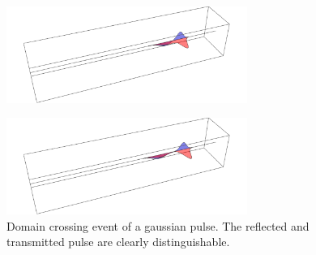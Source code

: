 \documentclass[12pt,a4paper]{article}
\begin{document}
	\begin{figure}[H]
		\centering
		\includegraphics[width=0.7\textwidth]{A2/data/A2f_Transition_4.png}
	\end{figure}
	\begin{figure}[H]
		\centering
		\includegraphics[width=0.7\textwidth]{A2/data/A2f_Transition_5.png}
		\caption[]{Domain crossing event of a gaussian pulse. The reflected and transmitted
		pulse are clearly distinguishable.}
	\end{figure}
\end{document}

